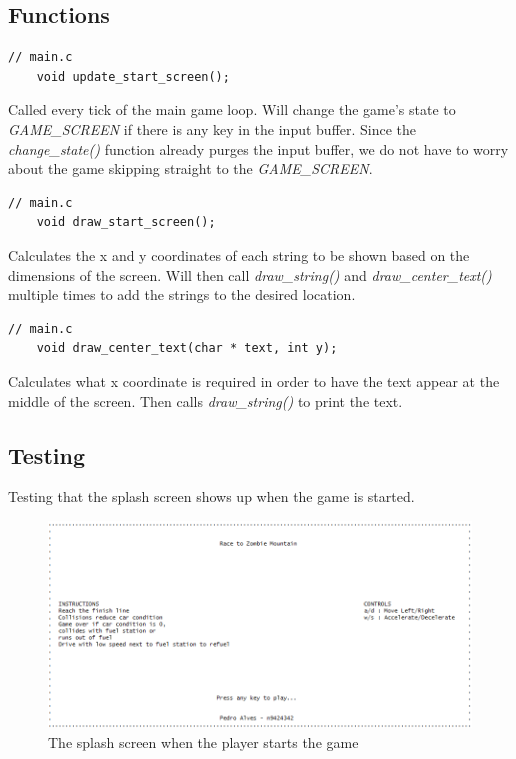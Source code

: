 \documentclass{article}
\begin{document}
\subsection*{Functions}
\begin{lstlisting}[style=CStyle]
	// main.c
	void update_start_screen();
\end{lstlisting}
Called every tick of the main game loop. Will change the game's state to \emph{GAME\_SCREEN} if there is any key in the input buffer. Since the \emph{change\_state()} function already purges the input buffer, we do not have to worry about the game skipping straight to the \emph{GAME\_SCREEN}.
\begin{lstlisting}[style=CStyle]
	// main.c
	void draw_start_screen();
\end{lstlisting}
Calculates the x and y coordinates of each string to be shown based on the dimensions of the screen. Will then call \emph{draw\_string()} and \emph{draw\_center\_text()} multiple times to add the strings to the desired location.
\begin{lstlisting}[style=CStyle]
	// main.c
	void draw_center_text(char * text, int y);
\end{lstlisting}
Calculates what x coordinate is required in order to have the text appear at the middle of the screen. Then calls \emph{draw\_string()} to print the text. 
\newline

\subsection*{Testing}
Testing that the splash screen shows up when the game is started.
\begin{figure}[h]
	\begin{center}
	\includegraphics[width=1\textwidth]{images/splash_screen}
	\caption{The splash screen when the player starts the game}
	\label{fig:splash_screen} 
	\end{center}
\end{figure}
\end{document}

